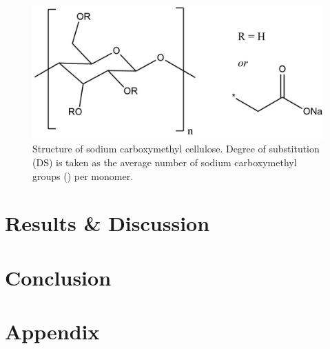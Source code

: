 \begin{figure}[h]
    \centering
    \includegraphics[width=0.8\columnwidth]{4-syntheses/figs/nc_structure.png}
    \caption{Structure of sodium carboxymethyl cellulose. Degree of substitution (DS) is taken as the average number of sodium carboxymethyl groups () per monomer.}
    \label{fig:nc_structure}
\end{figure}

\section{Results \& Discussion}

\section{Conclusion}




\section*{Appendix}